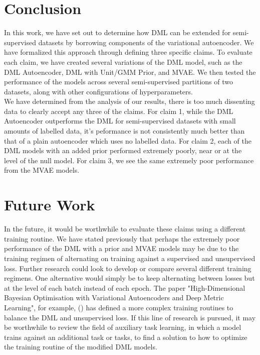 \documentclass[./dissertation.tex]{subfiles}
\begin{document}
    \section{Conclusion}
    
    In this work, we have set out to determine how DML can be extended for semi-supervised datasets by borrowing components of the variational autoencoder. We have formalized this approach through defining three specific claims. To evaluate each claim, we have created several variations of the DML model, such as the DML Autoencoder, DML with Unit/GMM Prior, and MVAE. We then tested the performance of the models across several semi-supervised partitions of two datasets, along with other configurations of hyperparameters.  \\
    
    We have determined from the analysis of our results, there is too much dissenting data to clearly accept any three of the claims. For claim 1, while the DML Autoencoder outperforms the DML for semi-supervised datasets with small amounts of labelled data, it's peformance is not consistently much better than that of a plain autoencoder which uses no labelled data. For claim 2, each of the DML models with an added prior performed extremely poorly, near or at the level of the null model. For claim 3, we see the same extremely poor performance from the MVAE models. 
    
    \section{Future Work}
    
    In the future, it would be worthwhile to evaluate these claims using a different training routine. We have stated previously that perhaps the extremely poor performance of the DML with a prior and MVAE models may be due to the training regimen of alternating on training against a supervised and unsupervised loss. Further research could look to develop or compare several different training regimens. One alternative would simply be to keep alternating between losses but at the level of each batch instead of each epoch. The paper "High-Dimensional Bayesian Optimisation with Variational Autoencoders and Deep Metric Learning", for example, (\cite{grosnit2021high}) has defined a more complex training routines to balance the DML and unsupervised loss. If this line of research is pursued, it may be worthwhile to review the field of auxiliary task learning, in which a model trains against an additional task or tasks, to find a solution to how to optimize the training routine of the modified DML models. \\
    
\end{document}
